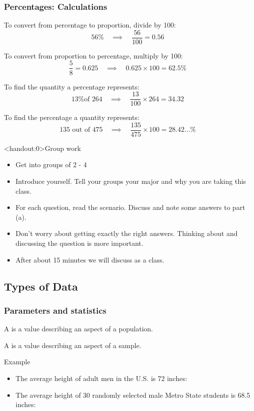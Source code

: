\documentclass[xcolor=table]{beamer}
\begin{document}
\begin{frame}
\frametitle{Percentages: Calculations}
\begin{exampleblock}{}
To convert from percentage to proportion, divide by 100:
\[56\% \quad \implies \quad \frac {56}{100} = 0.56\]

To convert from proportion to percentage, multiply by 100:
\[\frac 5 8 = 0.625 \quad \implies \quad 0.625 \times 100 = 62.5\%\]

To find the quantity a percentage represents:
\[\text{13\% of 264}\quad \implies \quad \frac {13}{100} \times 264 = 34.32\]

To find the percentage a quantity represents:
\[\text{135 out of 475} \quad \implies \quad \frac {135}{475} \times 100 = 28.42\ldots \%\]
\end{exampleblock}
\end{frame}

\begin{frame}<handout:0>{Group work}
\begin{block}{}
\large
\begin{itemize}
\item Get into groups of 2 - 4
\item Introduce yourself. Tell your groups your major and why you are taking this class. 
\item For each question, read the scenario. Discuss and note some answers to part (a).
\item Don't worry about getting exactly the right answers. Thinking about and discussing the question is more important.
\item After about 15 minutes we will discuss as a class. 
\end{itemize}
\end{block}
\end{frame}



\subsection{Types of Data}

\begin{frame}
\frametitle{Parameters and statistics}

\begin{block}{}
\large A  is a value describing an aspect of a population.
\end{block}
\pause
\begin{block}{}
\large A  is a value describing an aspect of a sample.
\end{block}
\pause
\begin{exampleblock}{Example}
\begin{itemize}
\item The average height of adult men in the U.S. is 72 inches: 

\item The average height of 30 randomly selected male Metro State students is 68.5 inches: 
\end{itemize}
\end{exampleblock}

\end{frame}
\end{document}
